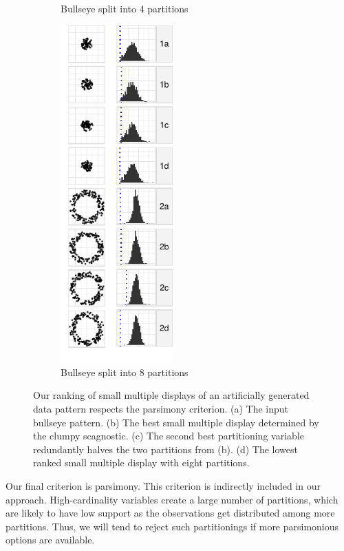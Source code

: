 \begin{figure}[t]
\begin{minipage}[b]{1.7in}
\begin{subfigure}[b]{\linewidth}
        \vspace{-0.5cm}
        \caption{Bullseye split into 4 partitions}
      \label{fig:pars3}        
      \end{subfigure}
    \end{minipage}
    \begin{subfigure}[b]{1.7in}
	\includegraphics[width=1.7in]{images/5_12851615653375-cluster2.pdf}
        \vspace{-0.5cm}
      \caption{Bullseye split into 8 partitions}
      \label{fig:pars4}
    \end{subfigure}
    \caption{Our ranking of small multiple displays of an artificially generated data pattern respects the parsimony criterion. (a) The input bullseye pattern. (b) The best small multiple display determined by the clumpy scagnostic. (c) The second best partitioning variable redundantly halves the two partitions from (b). (d) The lowest ranked small multiple display with eight partitions.}
    \label{fig:parsimonious}
  \end{figure}

Our final criterion is parsimony. This criterion is indirectly included in our approach. High-cardinality variables create a large number of partitions, which are likely to have low support as the observations get distributed among more partitions. Thus, we will tend to reject such partitionings if more parsimonious options are available.
 
